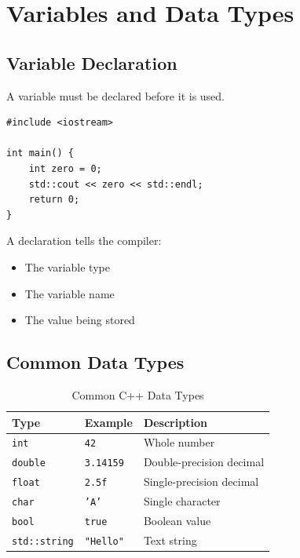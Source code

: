 \documentclass[10pt]{report}
\begin{document}
\section{Variables and Data Types}

\subsection{Variable Declaration}

A variable must be declared before it is used.

\begin{lstlisting}[caption={Integer Variable}]
#include <iostream>

int main() {
    int zero = 0;
    std::cout << zero << std::endl;
    return 0;
}
\end{lstlisting}

A declaration tells the compiler:

\begin{itemize}
    \item The variable type
    \item The variable name
    \item The value being stored
\end{itemize}

\subsection{Common Data Types}

\begin{table}[H]
\centering
\caption{Common C++ Data Types}
\begin{tabular}{lll}
\toprule
Type & Example & Description \\
\midrule
\texttt{int} & \texttt{42} & Whole number \\
\texttt{double} & \texttt{3.14159} & Double-precision decimal \\
\texttt{float} & \texttt{2.5f} & Single-precision decimal \\
\texttt{char} & \texttt{'A'} & Single character \\
\texttt{bool} & \texttt{true} & Boolean value \\
\texttt{std::string} & \texttt{"Hello"} & Text string \\
\bottomrule
\end{tabular}
\end{table}
\end{document}
